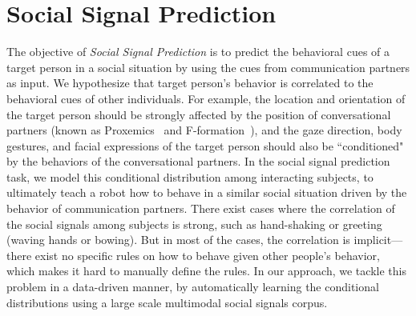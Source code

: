 
\section{Social Signal Prediction}
The objective of \emph{Social Signal Prediction} is to predict the behavioral cues of a target person in a social situation by using the cues from communication partners as input. We hypothesize that target person's behavior is correlated to the behavioral cues of other individuals. For example, the location and orientation of the target person should be strongly affected by the position of conversational partners (known as Proxemics~\cite{Hall66} and F-formation~\cite{kendon90}), and the gaze direction, body gestures, and facial expressions of the target person should also be ``conditioned" by the behaviors of the conversational partners. In the social signal prediction task, we model this conditional distribution among interacting subjects, to ultimately teach a robot how to behave in a similar social situation driven by the behavior of communication partners. There exist cases where the correlation of the social signals among subjects is strong, such as hand-shaking or greeting (waving hands or bowing). But in most of the cases, the correlation is implicit---there exist no specific rules on how to behave given other people's behavior, which makes it hard to manually define the rules. In our approach, we tackle this problem in a data-driven manner, by automatically learning the conditional distributions using a large scale multimodal social signals corpus.  

